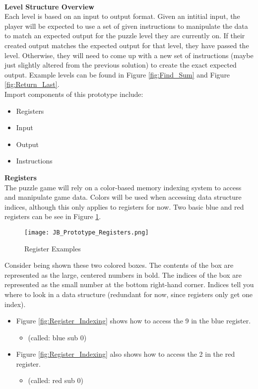 \\
\textbf{Level Structure Overview}\\

Each level is based on an input to output format. Given an intitial input, the player
will be expected to use a set of given instructions to manipulate the data to
match an expected output for the puzzle level they are currently on. If their
created output matches the expected output for that level, they have passed the level.
Otherwise, they will need to come up with a new set of instructions (maybe just
slightly altered from the previous solution) to create the exact expected output.
Example levels can be found in Figure \ref{fig:Find_Sum} and Figure \ref{fig:Return_Last}.\\

Import components of this prototype include:
\begin{itemize}
  \item Registers
  \item Input
  \item Output
  \item Instructions
\end{itemize}

\textbf{Registers}\\

The puzzle game will rely on a color-based memory indexing system to access and
manipulate game data. Colors will be used when accessing data structure indices,
although this only applies to registers for now. Two basic blue and red registers
can be see in Figure \ref{fig:Register_Examples}.

\begin{figure}[!hb]
  \caption{Register Examples}
  \label{fig:Register_Examples}
  \centering
  \texttt{[image: JB\_Prototype\_Registers.png]}
\end{figure}

Consider being shown these two colored boxes. The contents of the box are represented
as the large, centered numbers in bold. The indices of the box are represented as the
small number at the bottom right-hand corner. Indices tell you where to look in a
data structure (redundant for now, since registers only get one index).

\begin{itemize}
  \item Figure \ref{fig:Register_Indexing} shows how to access the 9 in the blue register.
  \begin{itemize}
    \item (called: blue sub 0)
  \end{itemize}
  \item Figure \ref{fig:Register_Indexing} also shows how to access the 2 in the red register.
  \begin{itemize}
    \item (called: red sub 0)
  \end{itemize}
\end{itemize}

